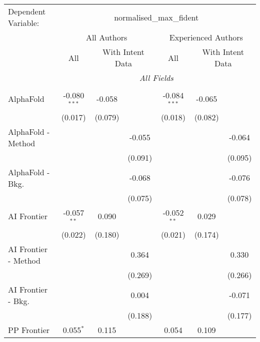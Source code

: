 \begingroup
\centering
\begin{tabular}{lcccccc}
   \tabularnewline \midrule \midrule
   Dependent Variable: & \multicolumn{6}{c}{normalised\_max\_fident}\\
 & \multicolumn{3}{c}{All Authors} & \multicolumn{3}{c}{Experienced Authors} \\
\cmidrule(lr){2-4} \cmidrule(lr){5-7}
 & \multicolumn{1}{c}{All} & \multicolumn{2}{c}{With Intent Data} & \multicolumn{1}{c}{All} & \multicolumn{2}{c}{With Intent Data} \\
\cmidrule(lr){2-2} \cmidrule(lr){3-4} \cmidrule(lr){5-5} \cmidrule(lr){6-7}
 & \multicolumn{6}{c}{\textit{All Fields}} \\ \\
   AlphaFold            & -0.080$^{***}$ & -0.058  &         & -0.084$^{***}$ & -0.065  &   \\   
                        & (0.017)        & (0.079) &         & (0.018)        & (0.082) &   \\   
   AlphaFold - Method   &                &         & -0.055  &                &         & -0.064\\   
                        &                &         & (0.091) &                &         & (0.095)\\   
   AlphaFold - Bkg.     &                &         & -0.068  &                &         & -0.076\\   
                        &                &         & (0.075) &                &         & (0.078)\\   
   AI Frontier          & -0.057$^{**}$  & 0.090   &         & -0.052$^{**}$  & 0.029   &   \\   
                        & (0.022)        & (0.180) &         & (0.021)        & (0.174) &   \\   
   AI Frontier - Method &                &         & 0.364   &                &         & 0.330\\   
                        &                &         & (0.269) &                &         & (0.266)\\   
   AI Frontier - Bkg.   &                &         & 0.004   &                &         & -0.071\\   
                        &                &         & (0.188) &                &         & (0.177)\\   
   PP Frontier          & 0.055$^{*}$    & 0.115   &         & 0.054          & 0.109   &   \\   

\end{tabular}
